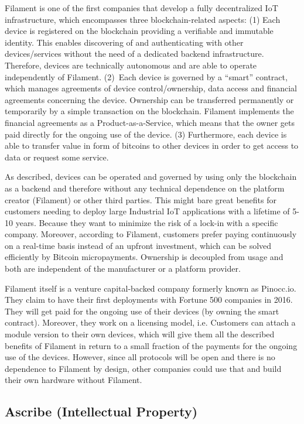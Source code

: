 Filament is one of the first companies that develop a fully decentralized IoT infrastructure, 
which encompasses three blockchain-related aspects: (1) Each device is registered 
on the blockchain providing a verifiable and immutable identity. This enables discovering 
of and authenticating with other devices/services without the need of a dedicated 
backend infrastructure. Therefore, devices are technically autonomous and are able 
to operate independently of Filament. (2)~Each device is governed by a ``smart'' 
contract, which manages agreements of device control/ownership, data access and 
financial agreements concerning the device. Ownership can be transferred permanently 
or temporarily by a simple transaction on the blockchain. Filament implements the 
financial agreements as a Product-as-a-Service, which means that the owner gets 
paid directly for the ongoing use of the device. (3) Furthermore, each device is 
able to transfer value in form of bitcoins to other devices in order to get access 
to data or request some service.

As described, devices can be operated and governed by using only the blockchain 
as a backend and therefore without any technical dependence on the platform creator 
(Filament) or other third parties. This might bare great benefits for customers 
needing to deploy large Industrial IoT applications with a lifetime of 5-10 years. 
Because they want to minimize the risk of a lock-in with a specific company. Moreover, 
according to Filament, customers prefer paying continuously on a real-time basis 
instead of an upfront investment, which can be solved efficiently by Bitcoin micropayments. 
Ownership is decoupled from usage and both are independent of the manufacturer 
or a platform provider.

Filament itself is a venture capital-backed company formerly known as Pinocc.io. 
They claim to have their first deployments with Fortune 500 companies in 2016. 
They will get paid for the ongoing use of their devices (by owning the smart contract). 
Moreover, they work on a licensing model, i.e. Customers can attach a module version 
to their own devices, which will give them all the described benefits of Filament 
in return to a small fraction of the payments for the ongoing use of the devices. 
However, since all protocols will be open and there is no dependence to Filament 
by design, other companies could use that and build their own hardware without 
Filament.

\subsection{Ascribe (Intellectual Property)}
\label{sec:ecoascribe}

